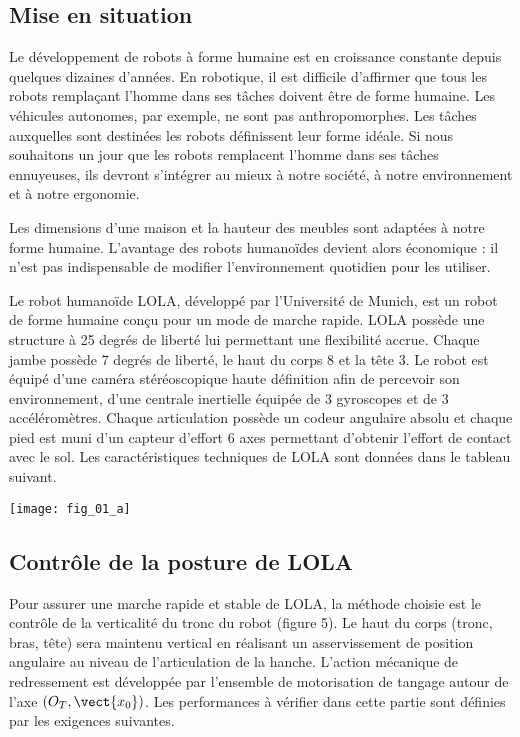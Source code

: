 \ifprof
\else
\begin{multicols}{2}
\fi

\subsection*{Mise en situation}
\ifprof
\else
Le développement de robots à forme humaine est en
croissance constante depuis quelques dizaines
d’années. En robotique, il est difficile d’affirmer que
tous les robots remplaçant l’homme dans ses tâches
doivent être de forme humaine. Les véhicules
autonomes, par exemple, ne sont pas
anthropomorphes. Les tâches auxquelles sont
destinées les robots définissent leur forme idéale. Si
nous souhaitons un jour que les robots remplacent
l’homme dans ses tâches ennuyeuses, ils devront
s’intégrer au mieux à notre société, à notre
environnement et à notre ergonomie.

Les dimensions d’une maison et la hauteur des meubles sont adaptées à notre forme humaine. L’avantage
des robots humanoïdes devient alors économique : il n’est pas indispensable de modifier l’environnement
quotidien pour les utiliser.

Le robot humanoïde LOLA, développé par l’Université de Munich, est un robot de forme humaine
conçu pour un mode de marche rapide. LOLA possède une structure à 25 degrés de liberté lui permettant une
flexibilité accrue. Chaque jambe possède 7 degrés de liberté, le haut du corps 8 et la tête 3.
Le robot est équipé d’une caméra stéréoscopique haute définition afin de percevoir son environnement, d’une
centrale inertielle équipée de 3 gyroscopes et de 3 accéléromètres. Chaque articulation possède un codeur
angulaire absolu et chaque pied est muni d’un capteur d’effort 6 axes permettant d’obtenir l’effort de contact
avec le sol. Les caractéristiques techniques de LOLA sont données dans le tableau suivant.


\begin{center}
\texttt{[image: fig\_01\_a]}
\end{center}

\subsection*{Contrôle de la posture de LOLA}
Pour assurer une marche rapide et stable de LOLA, la méthode choisie est le contrôle de la verticalité du tronc
du robot (figure 5). Le haut du corps (tronc, bras, tête) sera maintenu vertical en réalisant un asservissement
de position angulaire au niveau de l'articulation de la hanche. L'action mécanique de redressement est
développée par l'ensemble de motorisation de tangage autour de l'axe $(O_T,\vect{x_0})$. Les performances à vérifier
dans cette partie sont définies par les exigences suivantes.



\end{multicols}
